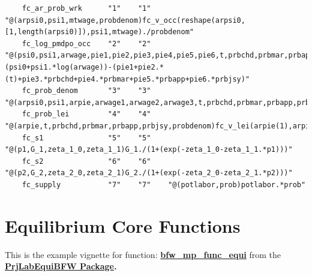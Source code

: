 \documentclass[
]{book}
\begin{document}
\begin{verbatim}
    fc_ar_prob_wrk      "1"    "1"    "@(arpsi0,psi1,mtwage,probdenom)fc_v_occ(reshape(arpsi0,[1,length(arpsi0)]),psi1,mtwage)./probdenom"                                                                                                                                                                        
    fc_log_pmdpo_occ    "2"    "2"    "@(psi0,psi1,arwage,pie1,pie2,pie3,pie4,pie5,pie6,t,prbchd,prbmar,prbapp,prbjsy)(psi0+psi1.*log(arwage))-(pie1+pie2.*(t)+pie3.*prbchd+pie4.*prbmar+pie5.*prbapp+pie6.*prbjsy)"                                                                                              
    fc_prob_denom       "3"    "3"    "@(arpsi0,psi1,arpie,arwage1,arwage2,arwage3,t,prbchd,prbmar,prbapp,prbjsy)fc_v_occ(arpsi0(1),psi1,arwage1)+fc_v_occ(arpsi0(2),psi1,arwage2)+fc_v_occ(arpsi0(3),psi1,arwage3)+fc_v_lei(arpie(1),arpie(2),arpie(3),arpie(4),arpie(5),arpie(6),t,prbchd,prbmar,prbapp,prbjsy)"
    fc_prob_lei         "4"    "4"    "@(arpie,t,prbchd,prbmar,prbapp,prbjsy,probdenom)fc_v_lei(arpie(1),arpie(2),arpie(3),arpie(4),arpie(5),arpie(6),t,prbchd,prbmar,prbapp,prbjsy)./probdenom"                                                                                                                  
    fc_s1               "5"    "5"    "@(p1,G_1,zeta_1_0,zeta_1_1)G_1./(1+(exp(-zeta_1_0-zeta_1_1.*p1)))"                                                                                                                                                                                                         
    fc_s2               "6"    "6"    "@(p2,G_2,zeta_2_0,zeta_2_1)G_2./(1+(exp(-zeta_2_0-zeta_2_1.*p2)))"                                                                                                                                                                                                         
    fc_supply           "7"    "7"    "@(potlabor,prob)potlabor.*prob"                                                                                                                                                                                                                                            
\end{verbatim}

\hypertarget{equilibrium-core-functions}{%
\section{Equilibrium Core Functions}\label{equilibrium-core-functions}}

This is the example vignette for function:
\href{https://github.com/FanWangEcon/PrjLabEquiBFW/tree/main/PrjLabEquiBFW/func/bfw_mp_func_equi.m}{\textbf{bfw\_mp\_func\_equi}}
from the \href{https://fanwangecon.github.io/PrjLabEquiBFW/}{\textbf{PrjLabEquiBFW
Package}}\textbf{.}
\end{document}
